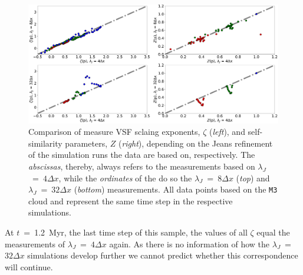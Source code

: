 \begin{figure}
	\centering
    \includegraphics[width=\textwidth]{comp_jeans.pdf}
    \caption{Comparison of measure VSF sclaing exponents, $\zeta$ (\textit{left}), and self-similarity parameters, $Z$ (\textit{right}), depending on the Jeans refinement of the simulation runs the data are based on, respectively. The \textit{abscissas}, thereby, always refers to the measurements based on $\lambda_J$~=~$4\Delta{}x$, while the \textit{ordinates} of the do so the $\lambda_J$~=~$8\Delta{}x$ (\textit{top}) and $\lambda_J$~=~$32\Delta{}x$ (\textit{bottom}) measurements. All data points based on the \texttt{M3} cloud and represent the same time step in the respective simulations. 
    }
    \label{pic:results:jeans_comp}
\end{figure}

At $t$~=~1.2~Myr, the last time step of this sample, the values of all $\zeta$ equal the measurements of $\lambda_J$~=~$4\Delta{}x$ again.
As there is no information of how the $\lambda_J$~=~$32\Delta{}x$ simulations develop further we cannot predict whether this correspondence will continue. 

